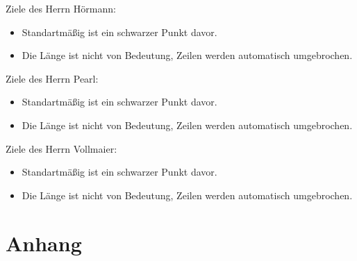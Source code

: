 Ziele des Herrn Hörmann:
\begin{itemize}
    \item Standartmäßig ist ein schwarzer Punkt davor.
    \item Die Länge ist nicht von Bedeutung, Zeilen werden automatisch umgebrochen.
\end{itemize}

\noindent\hrulefill

Ziele des Herrn Pearl:
\begin{itemize}
    \item Standartmäßig ist ein schwarzer Punkt davor.
    \item Die Länge ist nicht von Bedeutung, Zeilen werden automatisch umgebrochen.
\end{itemize}

\noindent\hrulefill

Ziele des Herrn Vollmaier:
\begin{itemize}
    \item Standartmäßig ist ein schwarzer Punkt davor.
    \item Die Länge ist nicht von Bedeutung, Zeilen werden automatisch umgebrochen.
\end{itemize}

\chapter{Anhang}




